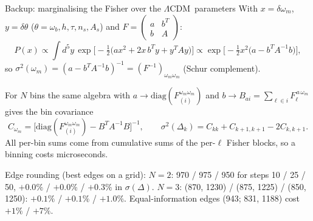 \documentclass[aspectratio=169,10pt]{beamer}
\newcommand{\om}{\omega_m}
\newcommand{\lcdm}{$\Lambda$CDM}
\begin{document}
\begin{frame}{Backup: marginalising the Fisher over the \lcdm\ parameters}
\small
With $x=\delta\om$, $y=\delta\theta$ ($\theta=\omega_b,h,\tau,n_s,A_s$) and
$F=\begin{pmatrix} a & b^T\\ b & A\end{pmatrix}$:
\[
P(x)\propto\int d^5y\,\exp\!\Big[-\tfrac12\big(a x^2+2x\,b^Ty+y^TAy\big)\Big]
\propto\exp\!\Big[-\tfrac12 x^2\big(a-b^TA^{-1}b\big)\Big],
\]
so $\sigma^2(\om)=(a-b^TA^{-1}b)^{-1}=(F^{-1})_{\om\om}$ (Schur complement).

\vspace{0.6em}
For $N$ bins the same algebra with $a\to\mathrm{diag}(F^{\om\om}_{(i)})$ and $b\to B_{ai}=\sum_{\ell\in i}F_\ell^{\,a\,\om}$ gives the
bin covariance
\[ C_{\om}=\big[\mathrm{diag}(F^{\om\om}_{(i)})-B^TA^{-1}B\big]^{-1},\qquad
\sigma^2(\Delta_k)=C_{kk}+C_{k+1,k+1}-2C_{k,k+1}. \]
All per-bin sums come from cumulative sums of the per-$\ell$ Fisher blocks, so a binning costs microseconds.

\vspace{0.6em}
{\scriptsize Edge rounding (best edges on a grid): $N=2$: 970 / 975 / 950 for steps 10 / 25 / 50, $+0.0\%$ / $+0.0\%$ / $+0.3\%$ in $\sigma(\Delta)$.
$N=3$: (870, 1230) / (875, 1225) / (850, 1250): $+0.1\%$ / $+0.1\%$ / $+1.0\%$. Equal-information edges (943; 831, 1188) cost $+1\%$ / $+7\%$.}
\end{frame}
\end{document}
